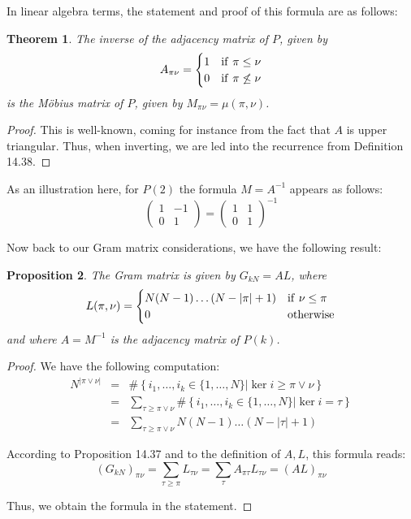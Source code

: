 \documentclass[12pt]{amsbook}
\newtheorem{theorem}{Theorem}[chapter]
\newtheorem{proposition}[theorem]{Proposition}
\begin{document}
In linear algebra terms, the statement and proof of this formula are as follows:

\begin{theorem}
The inverse of the adjacency matrix of $P$, given by
$$A_{\pi\nu}=\begin{cases}
1&{\rm if}\ \pi\leq\nu\\
0&{\rm if}\ \pi\not\leq\nu
\end{cases}$$
is the M\"obius matrix of $P$, given by $M_{\pi\nu}=\mu(\pi,\nu)$.
\end{theorem}

\begin{proof}
This is well-known, coming for instance from the fact that $A$ is upper triangular. Thus, when inverting, we are led into the recurrence from Definition 14.38.
\end{proof}

As an illustration here, for $P(2)$ the formula $M=A^{-1}$ appears as follows:
$$\begin{pmatrix}1&-1\\ 0&1\end{pmatrix}=
\begin{pmatrix}1&1\\ 0&1\end{pmatrix}^{-1}$$

Now back to our Gram matrix considerations, we have the following result:

\begin{proposition}
The Gram matrix is given by $G_{kN}=AL$, where
$$L(\pi,\nu)=
\begin{cases}
N(N-1)\ldots(N-|\pi|+1)&{\rm if}\ \nu\leq\pi\\
0&{\rm otherwise}
\end{cases}$$
and where $A=M^{-1}$ is the adjacency matrix of $P(k)$.
\end{proposition}

\begin{proof}
We have the following computation:
\begin{eqnarray*}
N^{|\pi\vee\nu|}
&=&\#\left\{i_1,\ldots,i_k\in\{1,\ldots,N\}\Big|\ker i\geq\pi\vee\nu\right\}\\
&=&\sum_{\tau\geq\pi\vee\nu}\#\left\{i_1,\ldots,i_k\in\{1,\ldots,N\}\Big|\ker i=\tau\right\}\\
&=&\sum_{\tau\geq\pi\vee\nu}N(N-1)\ldots(N-|\tau|+1)
\end{eqnarray*}

According to Proposition 14.37 and to the definition of $A,L$, this formula reads:
$$(G_{kN})_{\pi\nu}
=\sum_{\tau\geq\pi}L_{\tau\nu}
=\sum_\tau A_{\pi\tau}L_{\tau\nu}
=(AL)_{\pi\nu}$$

Thus, we obtain the formula in the statement.
\end{proof}
\end{document}
